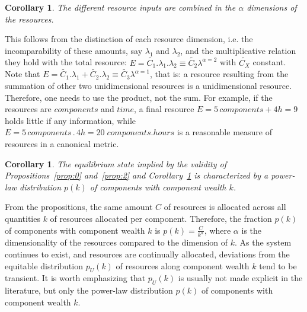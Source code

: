 \documentclass[a4paper, 11pt]{article} %
\newtheorem{corollary}[theorem2]{Corollary}
\begin{document}
\begin{corollary}\label{prop:1}
	The different resource inputs are combined in the $\alpha$ dimensions of the resources.
\end{corollary}



%

This follows from the distinction of each resource dimension,
i.e. the incomparability of these amounts, say $\lambda_1$ and $\lambda_2$, and the multiplicative relation they hold with the total resource: $E=\widetilde{C_1} . \lambda_1 . \lambda_2 \equiv \widetilde{C_2}\lambda^{\alpha=2}$
with $\widetilde{C_X}$ constant.
Note that $E=\widetilde{C_1} . \lambda_1 + \widetilde{C_2}.\lambda_2 \equiv \widetilde{C_3}\lambda^{\alpha=1}$, that is: a resource resulting from the summation of other two unidimensional resources is a unidimensional resource. Therefore, one needs to use the product, not the sum. For example, if the resources are $components$ and $time$,
a final resource $E=5\, components + 4h=9$
holds little if any information, while
$E= 5\, components \, . \, 4 h= 20\; components . hours$ is
a reasonable measure of resources in a canonical metric.

\begin{corollary}\label{prop:3}
	The equilibrium state implied by the validity of Propositions~\ref{prop:0} and~\ref{prop:2} and Corollary~\ref{prop:1} is characterized by a power-law distribution $p(k)$ of components with component wealth $k$.
\end{corollary}

From the propositions, the same amount $C$ of resources is allocated
across all quantities $k$ of resources allocated per component.
Therefore, the fraction $p(k)$ of components with component wealth $k$ is
$p(k)=\frac{C}{k^\alpha}$, where $\alpha$ is
the dimensionality of the resources compared to the dimension of $k$.
As the system continues to exist,
and resources are continually allocated, deviations from the equitable distribution $p_U(k)$ of resources along component wealth $k$  tend to be transient. It is worth emphasizing that $p_U(k)$ is usually not made explicit in the literature, but only
 the power-law distribution $p(k)$ of components
with component wealth $k$.
\end{document}
